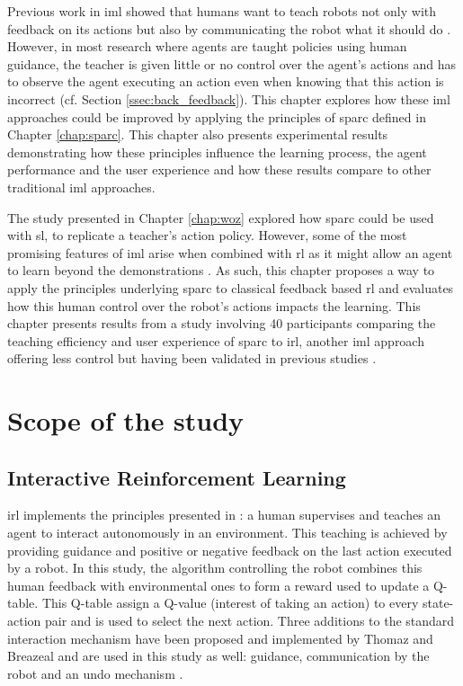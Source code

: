 Previous work in \gls{iml} showed that humans want to teach robots not only with feedback on its actions but also by communicating the robot what it should do \citep{thomaz2008teachable}. However, in most research where agents are taught policies using human guidance, the teacher is given little or no control over the agent's actions and has to observe the agent executing an action even when knowing that this action is incorrect (cf. Section \ref{ssec:back_feedback}). This chapter explores how these \gls{iml} approaches could be improved by applying the principles of \gls{sparc} defined in Chapter \ref{chap:sparc}. This chapter also presents experimental results demonstrating how these principles influence the learning process, the agent performance and the user experience and how these results compare to other traditional \gls{iml} approaches.

The study presented in Chapter \ref{chap:woz} explored how \gls{sparc} could be used with \acrlong{sl}, to replicate a teacher's action policy. However, some of the most promising features of \gls{iml} arise when combined with \gls{rl} as it might allow an agent to learn beyond the demonstrations \citep{abbeel2004apprenticeship}. As such, this chapter proposes a way to apply the principles underlying \gls{sparc} to classical feedback based \gls{rl} and evaluates how this human control over the robot's actions impacts the learning. This chapter presents results from a study involving 40 participants comparing the teaching efficiency and user experience of \gls{sparc} 
to \gls{irl}, another \gls{iml} approach offering less control but having been validated in previous studies \citep{thomaz2008teachable}. %

\section{Scope of the study}

\subsection{Interactive Reinforcement Learning}

\gls{irl} implements the principles presented in \cite{thomaz2008teachable}: a human supervises and teaches an agent to interact autonomously in an environment. This teaching is achieved by providing guidance and positive or negative feedback on the last action executed by a robot. In this study, the algorithm controlling the robot combines this human feedback with environmental ones to form a reward used to update a Q-table. This Q-table assign a Q-value (interest of taking an action) to every state-action pair and is used to select the next action. Three additions to the standard interaction mechanism have been proposed and implemented by Thomaz and Breazeal and are used in this study as well: guidance, communication by the robot and an undo mechanism \citep{thomaz2008teachable}. 

